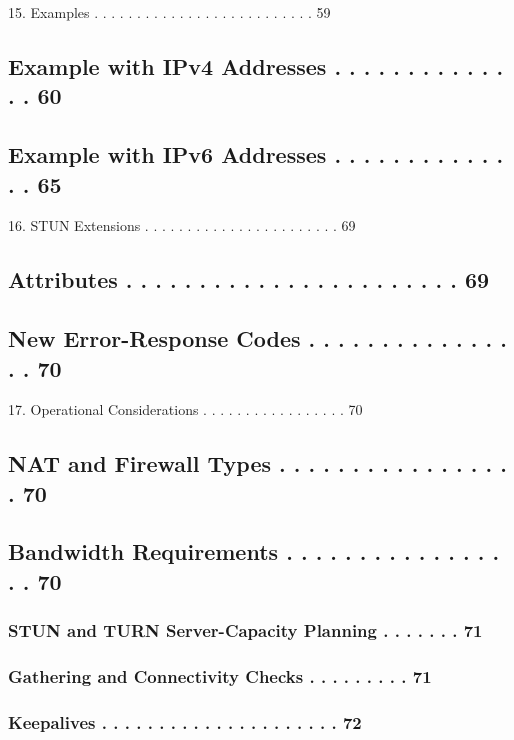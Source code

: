 \documentclass{article}
\begin{document}
15. Examples  . . . . . . . . . . . . . . . . . . . . . . . . . .  59

\subsection{Example with IPv4 Addresses  . . . . . . . . . . . . . .  60}

\subsection{Example with IPv6 Addresses  . . . . . . . . . . . . . .  65}

16. STUN Extensions . . . . . . . . . . . . . . . . . . . . . . .  69

\subsection{Attributes . . . . . . . . . . . . . . . . . . . . . . .  69}

\subsection{New Error-Response Codes . . . . . . . . . . . . . . . .  70}

17. Operational Considerations  . . . . . . . . . . . . . . . . .  70

\subsection{NAT and Firewall Types . . . . . . . . . . . . . . . . .  70}

\subsection{Bandwidth Requirements . . . . . . . . . . . . . . . . .  70}

\subsubsection{STUN and TURN Server-Capacity Planning . . . . . . .  71}

\subsubsection{Gathering and Connectivity Checks  . . . . . . . . .  71}

\subsubsection{Keepalives . . . . . . . . . . . . . . . . . . . . .  72}
\end{document}
